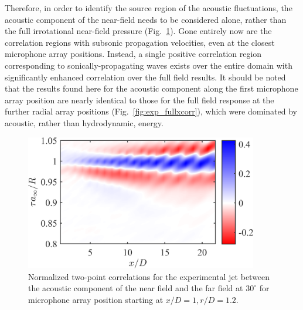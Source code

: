 \documentclass[english]{aiaa-tc}
\newcommand*{\fig}[1]{Fig.~\ref{#1}}
\begin{document}
Therefore, in order to identify the source region of the acoustic fluctuations, the acoustic component of the near-field needs to be considered alone, rather than the full irrotational near-field pressure (\fig{fig:exp_St000_acoustic}). 
Gone entirely now are the correlation regions with subsonic propagation velocities, even at the closest microphone array positions.
Instead, a single positive correlation region corresponding to sonically-propagating waves exists over the entire domain with significantly enhanced correlation over the full field results. 
It should be noted that the results found here for the acoustic component along the first microphone array position are nearly identical to those for the full field response at the further radial array positions (\fig{fig:exp_fullxcorr}), which were dominated by acoustic, rather than hydrodynamic, energy.
\begin{figure}
	\centering
	\includegraphics[width=4in]{figures/png/Exp/exp_St000_xcorr_acoustic.png}
	\caption{Normalized two-point correlations for the experimental jet between the acoustic component of the near field and the far field at $30^\circ$ for microphone array position starting at $x/D = 1, r/D = 1.2$. }
	\label{fig:exp_St000_acoustic}
\end{figure}
\end{document}
